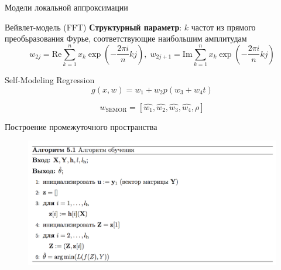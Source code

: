 \documentclass{beamer}
\begin{document}

\begin{frame}{Модели локальной аппроксимации}
    \begin{block}{Вейвлет-модель (FFT)}
        \textbf{Структурный параметр}: $k$ частот из прямого преобьразования Фурье,
        соответствующие наибольшим амплитудам
        $$
    w_{2j} = \mathrm{Re} \sum_{k=1}^{n} x_k \exp(-\frac{2\pi i}{n}kj), \; w_{2j + 1} = \mathrm{Im} \sum_{k=1}^{n} x_k \exp(-\frac{2\pi i}{n}kj)
        $$
    \end{block}
    \begin{block}{Self-Modeling Regression}
    $$
    g(x, w) = w_1 + w_2 p(w_3 + w_4t)
    $$

    $$
    w_{\text{SEMOR}} = [\hat{w_1}, \hat{w_2}, \hat{w_3}, \hat{w_4}, \rho]
    $$
    \end{block}
\end{frame}

\begin{frame}{Построение промежуточного пространства}
    \begin{figure}[ht]
        \centering
          \includegraphics[width=\textwidth]{../pics/algo.png}
    \end{figure}
\end{frame}
\end{document}
